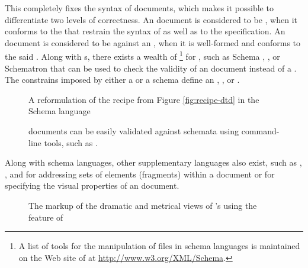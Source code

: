 This  completely fixes the syntax of  documents, which
makes it possible to differentiate two levels of correctness. An 
document is considered to be %
, when it conforms to the 
 that restrain the syntax of  as well as to the
specification. An  document is considered to be 
 against an  , when it is
well-formed and conforms to the said  .  Along with
s, there exists a wealth of \footnote{
  A list of tools for the manipulation of files in  schema
  languages is maintained on the Web site of  at
  \url{http://www.w3.org/XML/Schema}.
} for , such as   Schema%
, , or Schematron that can be used to
check the validity of an  document instead of a .
The constrains imposed by either a  or a schema define an
, , or .
 

\begin{figure}
  \caption{A reformulation of the recipe  from Figure
    \ref{fig:recipe-dtd} in the  Schema 
    language}
  \label{fig:recipe-xsd}
\end{figure}

\begin{figure}
  \caption{ documents can be easily validated against 
    schemata using command-line tools, such as .}
\end{figure}

Along with schema languages, other supplementary languages also exist, such as
, , and  for addressing sets of elements
(fragments) within a  document or  for specifying the
visual properties of an  document.

\begin{figure}[!b]
  \caption{The markup of the dramatic and metrical views of 's  using the  feature of
    }
\end{figure}

